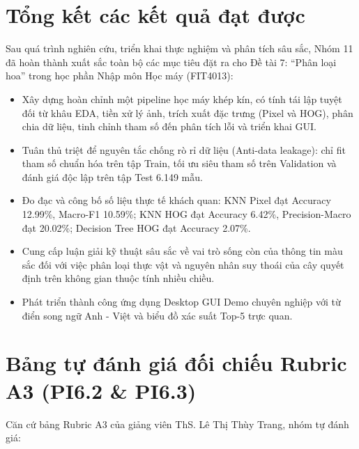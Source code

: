 \documentclass[../DoAn.tex]{subfiles}
\begin{document}
\section{Tổng kết các kết quả đạt được}
Sau quá trình nghiên cứu, triển khai thực nghiệm và phân tích sâu sắc, Nhóm 11 đã hoàn thành xuất sắc toàn bộ các mục tiêu đặt ra cho Đề tài 7: ``Phân loại hoa'' trong học phần Nhập môn Học máy (FIT4013):
\begin{itemize}
    \item Xây dựng hoàn chỉnh một pipeline học máy khép kín, có tính tái lập tuyệt đối từ khâu EDA, tiền xử lý ảnh, trích xuất đặc trưng (Pixel và HOG), phân chia dữ liệu, tinh chỉnh tham số đến phân tích lỗi và triển khai GUI.
    \item Tuân thủ triệt để nguyên tắc chống rò rỉ dữ liệu (Anti-data leakage): chỉ fit tham số chuẩn hóa trên tập Train, tối ưu siêu tham số trên Validation và đánh giá độc lập trên tập Test 6.149 mẫu.
    \item Đo đạc và công bố số liệu thực tế khách quan: KNN Pixel đạt Accuracy 12.99\%, Macro-F1 10.59\%; KNN HOG đạt Accuracy 6.42\%, Precision-Macro đạt 20.02\%; Decision Tree HOG đạt Accuracy 2.07\%.
    \item Cung cấp luận giải kỹ thuật sâu sắc về vai trò sống còn của thông tin màu sắc đối với việc phân loại thực vật và nguyên nhân suy thoái của cây quyết định trên không gian thuộc tính nhiều chiều.
    \item Phát triển thành công ứng dụng Desktop GUI Demo chuyên nghiệp với từ điển song ngữ Anh - Việt và biểu đồ xác suất Top-5 trực quan.
\end{itemize}

\section{Bảng tự đánh giá đối chiếu Rubric A3 (PI6.2 \& PI6.3)}
Căn cứ bảng Rubric A3 của giảng viên ThS. Lê Thị Thùy Trang, nhóm tự đánh giá:
\end{document}
